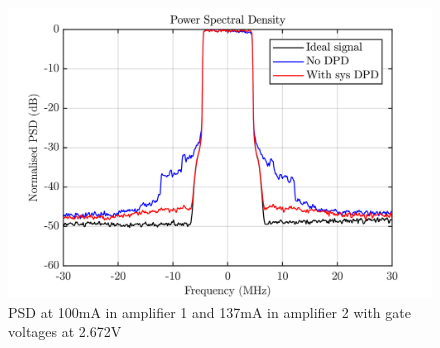 \begin{figure}[H]
\centering 
\includegraphics[scale = 0.5]{figures/measurement/cree/meas5/psd_2p672v.png}
\caption{PSD at 100mA in amplifier 1 and 137mA in amplifier 2 with gate voltages at 2.672V}
\label{fig:meas5_9}
\end{figure}





 

